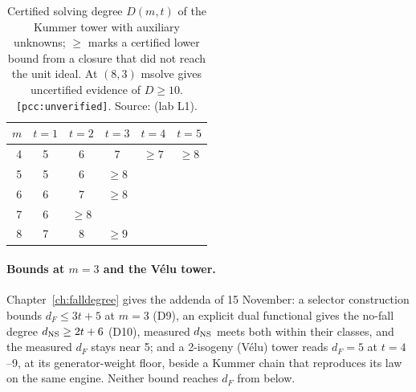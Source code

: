 \begin{table}[t]
\centering\small
\begin{tabular}{@{}rccccc@{}}
\toprule
$m$ & $t=1$ & $t=2$ & $t=3$ & $t=4$ & $t=5$ \\
\midrule
4 & 5 & 6 & 7 & $\ge7$ & $\ge8$ \\
5 & 5 & 6 & $\ge8$ & & \\
6 & 6 & 7 & $\ge8$ & & \\
7 & 6 & $\ge8$ & & & \\
8 & 7 & 8 & $\ge9$ & & \\
\bottomrule
\end{tabular}
\caption[]{Certified solving degree $D(m,t)$ of the Kummer tower with
auxiliary unknowns; $\ge$ marks a certified lower bound from a closure that
did not reach the unit ideal. At $(8,3)$ msolve gives uncertified evidence
of $D\ge10$. \texttt{[pcc:unverified]}. Source:
 (lab L1).}
\label{tab:pa-dmt}
\end{table}

\paragraph{Bounds at $m=3$ and the V\'elu tower.} Chapter~\ref{ch:falldegree}
gives the addenda of 15 November: a selector construction bounds
$d_F\le3t+5$ at $m=3$ (D9), an explicit dual functional gives the no-fall
degree $d_{\rm NS}\ge2t+6$ (D10), measured $d_{\rm NS}$ meets both within their
classes, and the measured $d_F$ stays near 5; and a 2-isogeny (V\'elu) tower
reads $d_F=5$ at $t=4$--9, at its generator-weight floor, beside a Kummer
chain that reproduces its law on the same engine. Neither bound reaches
$d_F$ from below.

